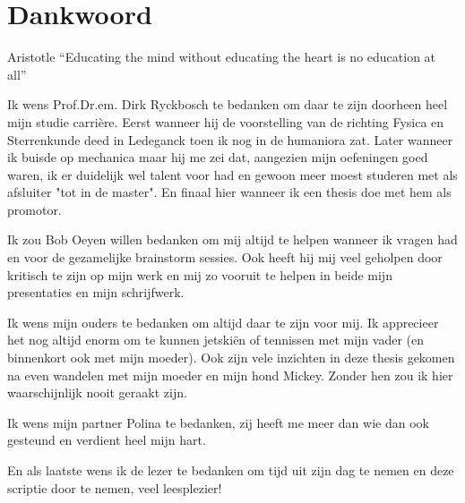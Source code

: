 \chapter*{Dankwoord}
\begin{chapquote}{Aristotle}
``Educating the mind without educating the heart is no education at all''
\end{chapquote}
Ik wens Prof.Dr.em. Dirk Ryckbosch te bedanken om daar te zijn doorheen
heel mijn studie carrière. Eerst wanneer hij de voorstelling van de richting
Fysica en Sterrenkunde deed in Ledeganck toen ik nog in de humaniora zat. Later wanneer ik buisde op
mechanica maar hij me zei dat, aangezien mijn oefeningen goed waren, ik er
duidelijk wel talent voor had en gewoon meer moest studeren met als afsluiter
"tot in de master". En finaal hier wanneer ik een thesis doe met hem als
promotor.

Ik zou Bob Oeyen willen bedanken om mij altijd te helpen wanneer ik
vragen had en voor de gezamelijke brainstorm sessies. 
Ook heeft hij mij veel geholpen door kritisch te zijn op
mijn werk en mij zo vooruit te helpen in beide mijn presentaties en
mijn schrijfwerk.

Ik wens mijn ouders te bedanken om altijd daar te zijn voor mij.
Ik apprecieer het nog altijd enorm om te kunnen jetskiën of
tennissen met mijn vader (en binnenkort ook met mijn moeder).
Ook zijn vele inzichten in deze thesis gekomen na even wandelen
met mijn moeder en mijn hond Mickey.  Zonder hen zou ik hier
waarschijnlijk nooit geraakt zijn.

Ik wens mijn partner Polina te bedanken, zij
heeft me meer dan wie dan ook gesteund en verdient heel mijn
hart.

En als laatste wens ik de lezer te bedanken om tijd uit zijn 
dag te nemen en deze scriptie door te nemen, veel leesplezier! 
